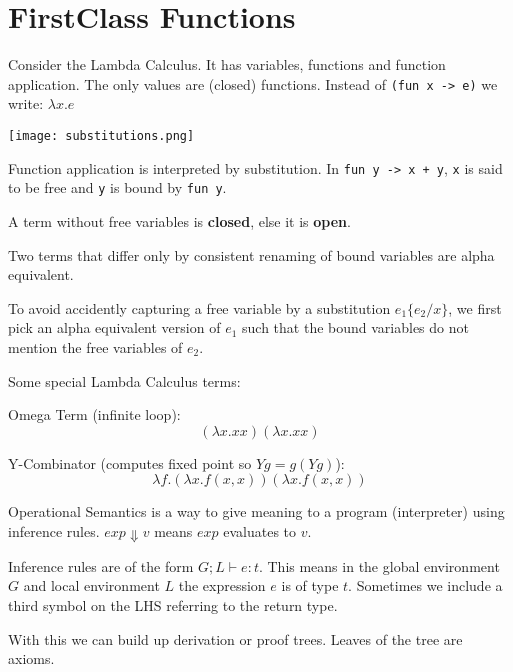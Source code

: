\section*{FirstClass Functions}

Consider the Lambda Calculus. It has variables, functions and function application. The only values are (closed) functions. Instead of \texttt{(fun x -> e)} we write: $\lambda x. e$

\begin{center}
	\texttt{[image: substitutions.png]}
\end{center}
		
Function application is interpreted by substitution. In \texttt{fun y -> x + y}, \texttt{x} is said to be free and \texttt{y} is bound by \texttt{fun y}. \medskip

A term without free variables is \textbf{closed}, else it is \textbf{open}.
	
Two terms that differ only by consistent renaming of bound variables are alpha equivalent. \medskip

To avoid accidently capturing a free variable by a substitution $e_1 \{e_2 / x\}$, we first pick an alpha equivalent version of $e_1$ such that the bound variables do not mention the free variables of $e_2$.\medskip

Some special Lambda Calculus terms:
\begin{compactitem}
	\item Omega Term (infinite loop): 
	$$(\lambda x. x x)(\lambda x. x x)$$
	
	\item Y-Combinator (computes fixed point so $Yg = g(Yg)$): 
	$$\lambda f. (\lambda x. f(x, x))(\lambda x. f(x, x))$$
\end{compactitem}\medskip
	
Operational Semantics is a way to give meaning to a program (interpreter) using inference rules. $exp \Downarrow v$ means $exp$ evaluates to $v$. \medskip

Inference rules are of the form $G; L \vdash e : t$. This means in the global environment $G$ and local environment $L$ the expression $e$ is of type $t$. Sometimes we include a third symbol on the LHS referring to the return type. \medskip

With this we can build up derivation or proof trees. Leaves of the tree are axioms.
